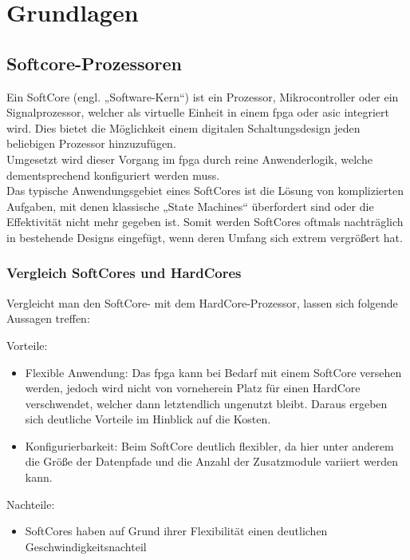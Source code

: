 \chapter{Grundlagen}\label{kap:grundlagen}
\section{Softcore-Prozessoren}\label{kap:softcoreprozessoren}

Ein SoftCore (engl. „Software-Kern“) ist ein Prozessor, Mikrocontroller oder ein Signalprozessor, welcher als virtuelle Einheit in einem \ac{fpga} oder \ac{asic} integriert wird.
Dies bietet die Möglichkeit einem digitalen Schaltungsdesign jeden beliebigen Prozessor hinzuzufügen.\\
Umgesetzt wird dieser Vorgang im \ac{fpga} durch reine Anwenderlogik,
welche dementsprechend konfiguriert werden muss.\\
Das typische Anwendungsgebiet eines SoftCores ist die Lösung von komplizierten Aufgaben, mit denen klassische „State Machines“ überfordert sind oder die Effektivität
 nicht mehr gegeben ist. Somit werden SoftCores oftmals nachträglich in bestehende Designs eingefügt, wenn deren Umfang sich extrem vergrößert hat.\cite{softcore}\\

\subsection{Vergleich SoftCores und HardCores}\label{kap:vergleich}

Vergleicht man den SoftCore- mit dem HardCore-Prozessor, lassen sich folgende Aussagen treffen:

Vorteile:
\begin{itemize}
   \item Flexible Anwendung: Das \ac{fpga} kann bei Bedarf mit einem SoftCore versehen werden, jedoch wird nicht von vorneherein Platz für einen HardCore verschwendet, welcher
    dann letztendlich ungenutzt bleibt. Daraus ergeben sich deutliche Vorteile im Hinblick auf die Kosten.
    \item Konfigurierbarkeit: Beim SoftCore deutlich flexibler, da hier unter anderem die Größe der Datenpfade und die Anzahl der Zusatzmodule variiert werden kann.
 \end{itemize}


Nachteile:
\begin{itemize}
  \item SoftCores haben auf Grund ihrer Flexibilität einen deutlichen Geschwindigkeitsnachteil
\end{itemize}

